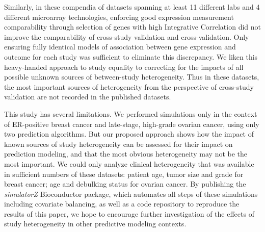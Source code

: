 \documentclass{bioinfo}
\begin{document}
Similarly, in these compendia of datasets spanning at least 11 different labs
and 4 different microarray technologies, enforcing good
expression measurement comparability through selection of genes with
high Integrative Correlation \citep{Parmigiani2004, Garrett-Mayer2008} did not improve
the comparability of cross-study validation and cross-validation. Only
ensuring fully identical models of association between gene expression
and outcome for each study was sufficient to eliminate this
discrepancy. %
We liken this heavy-handed approach to study equality to
correcting for the impacts of all possible unknown sources of
between-study heterogeneity. Thus in these datasets, the most
important sources of heterogeneity from the perspective of cross-study
validation are not recorded in the published datasets.

This study has several limitations. %
We performed simulations only in the context of ER-positive breast cancer and
late-stage, high-grade ovarian cancer, using only two prediction algorithms. But our proposed
approach shows how the impact of known sources of study heterogeneity
can be assessed for their impact on prediction modeling, and that the
most obvious heterogeneity may not be the most important. 
We could only analyze clinical
heterogeneity that was available in sufficient numbers of these
datasets: patient age, tumor size and grade for breast cancer;
age and debulking status for ovarian cancer.  By
publishing the \emph{simulatorZ} Bioconductor package, which automates
all steps of these simulations including covariate balancing, as well
as a code repository to reproduce the results of this paper, we hope
to encourage further investigation of the effects of study
heterogeneity in other predictive modeling contexts.
\end{document}
